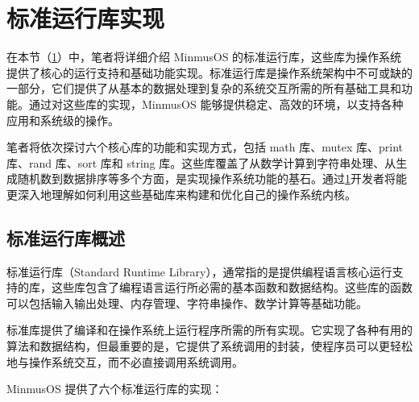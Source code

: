 \section{标准运行库实现}\label{sec:StandardRuntimeLibraryImplementation}

在本节（\cref{sec:StandardRuntimeLibraryImplementation}）中，笔者将详细介绍 MinmusOS 的标准运行库，这些库为操作系统提供了核心的运行支持和基础功能实现。标准运行库是操作系统架构中不可或缺的一部分，它们提供了从基本的数据处理到复杂的系统交互所需的所有基础工具和功能。通过对这些库的实现，MinmusOS 能够提供稳定、高效的环境，以支持各种应用和系统级的操作。

笔者将依次探讨六个核心库的功能和实现方式，包括 math 库、mutex 库、print 库、rand 库、sort 库和 string 库。这些库覆盖了从数学计算到字符串处理、从生成随机数到数据排序等多个方面，是实现操作系统功能的基石。通过\cref{sec:StandardRuntimeLibraryImplementation}开发者将能更深入地理解如何利用这些基础库来构建和优化自己的操作系统内核。

\subsection{标准运行库概述}

标准运行库（Standard Runtime Library），通常指的是提供编程语言核心运行支持的库，这些库包含了编程语言运行所必需的基本函数和数据结构。这些库的函数可以包括输入输出处理、内存管理、字符串操作、数学计算等基础功能。

标准库提供了编译和在操作系统上运行程序所需的所有实现。它实现了各种有用的算法和数据结构，但最重要的是，它提供了系统调用的封装，使程序员可以更轻松地与操作系统交互，而不必直接调用系统调用。

MinmusOS 提供了六个标准运行库的实现：

